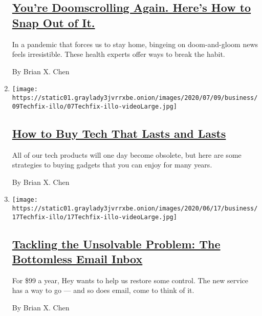 \begin{enumerate}
{  \subsection{\texorpdfstring{\href{/2020/07/15/technology/personaltech/youre-doomscrolling-again-heres-how-to-snap-out-of-it.html}{You're
  Doomscrolling Again. Here's How to Snap Out of
  It.}}{You're Doomscrolling Again. Here's How to Snap Out of It.}}\label{youre-doomscrolling-again-heres-how-to-snap-out-of-it}}

  In a pandemic that forces us to stay home, bingeing on doom-and-gloom
  news feels irresistible. These health experts offer ways to break the
  habit.

  By Brian X. Chen
\item
  \texttt{[image: https://static01.graylady3jvrrxbe.onion/images/2020/07/09/business/09Techfix-illo/07Techfix-illo-videoLarge.jpg]}

  \hypertarget{how-to-buy-tech-that-lasts-and-lasts}{%
  \subsection{\texorpdfstring{\href{/2020/07/08/technology/personaltech/tech-that-lasts.html}{How
  to Buy Tech That Lasts and
  Lasts}}{How to Buy Tech That Lasts and Lasts}}\label{how-to-buy-tech-that-lasts-and-lasts}}

  All of our tech products will one day become obsolete, but here are
  some strategies to buying gadgets that you can enjoy for many years.

  By Brian X. Chen
\item
  \texttt{[image: https://static01.graylady3jvrrxbe.onion/images/2020/06/17/business/17Techfix-illo/17Techfix-illo-videoLarge.jpg]}

  \hypertarget{tackling-the-unsolvable-problem-the-bottomless-email-inbox}{%
  \subsection{\texorpdfstring{\href{/2020/06/17/technology/personaltech/hey-email-service-screening.html}{Tackling
  the Unsolvable Problem: The Bottomless Email
  Inbox}}{Tackling the Unsolvable Problem: The Bottomless Email Inbox}}\label{tackling-the-unsolvable-problem-the-bottomless-email-inbox}}

  For \$99 a year, Hey wants to help us restore some control. The new
  service has a way to go --- and so does email, come to think of it.

  By Brian X. Chen
\end{enumerate}

